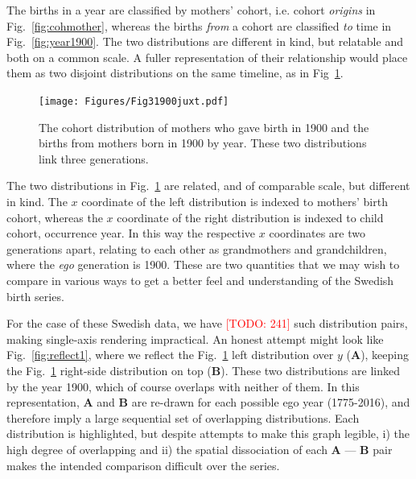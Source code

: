 \documentclass{article}
\newcommand\todo[1]{\textcolor{red}{[TODO: #1]}}
\begin{document}
The births in a year are classified by mothers' cohort, i.e. cohort \emph{origins} in Fig.~\ref{fig:cohmother}, whereas the births \emph{from} a cohort are classified \emph{to} time in Fig.~\ref{fig:year1900}. The two distributions are different in kind, but relatable and both on a common scale. A fuller representation of their relationship would place them as two disjoint distributions on the same timeline, as in Fig~\ref{fig:juxt}.

\begin{figure}[ht!]
 \centering
        \texttt{[image: Figures/Fig31900juxt.pdf]}
        \caption{The cohort distribution of mothers who gave birth in 1900 and the births from mothers born in 1900 by year. These two distributions link three generations.}
          \label{fig:juxt}
\end{figure}

The two distributions in Fig.~\ref{fig:juxt} are related, and of comparable scale, but different in kind. The $x$ coordinate of the left distribution is indexed to mothers' birth cohort, whereas the $x$ coordinate of the right distribution is indexed to child cohort, occurrence year. In this way the respective $x$ coordinates are two generations apart, relating to each other as grandmothers and grandchildren, where the \emph{ego} generation is 1900. These are two quantities that we may wish to compare in various ways to get a better feel and understanding of the Swedish birth series. 

For the case of these Swedish data, we have \todo{241} such distribution pairs, making single-axis rendering impractical. An honest attempt might look like Fig.~\ref{fig:reflect1}, where we reflect the Fig.~\ref{fig:juxt} left distribution over $y$ (\textbf{A}), keeping the Fig.~\ref{fig:juxt} right-side distribution on top (\textbf{B}). These two distributions are linked by the year 1900, which of course overlaps with neither of them. In this representation, \textbf{A} and \textbf{B} are re-drawn for each possible ego year (1775-2016), and therefore imply a large sequential set of overlapping distributions. Each  distribution is highlighted, but despite attempts to make this graph legible, i) the high degree of overlapping and ii) the spatial dissociation of each \textbf{A} --- \textbf{B} pair makes the intended comparison difficult over the series.
\end{document}
